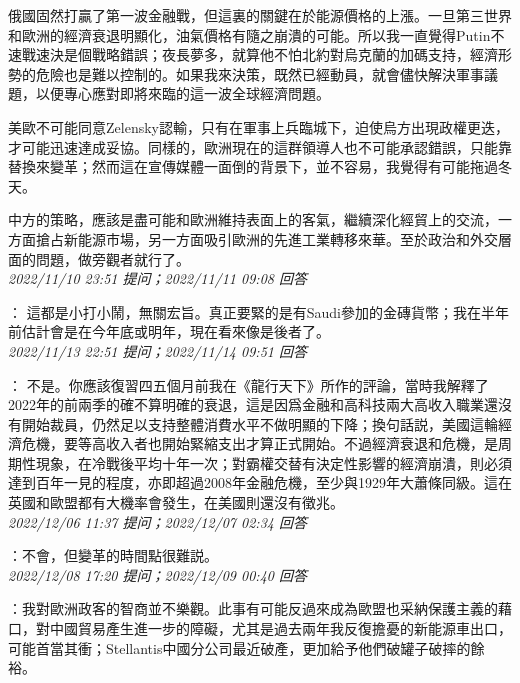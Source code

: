 \documentclass[twocolumn]{ctexart}
\begin{document}
俄國固然打贏了第一波金融戰，但這裏的關鍵在於能源價格的上漲。一旦第三世界和歐洲的經濟衰退明顯化，油氣價格有隨之崩潰的可能。所以我一直覺得Putin不速戰速決是個戰略錯誤；夜長夢多，就算他不怕北約對烏克蘭的加碼支持，經濟形勢的危險也是難以控制的。如果我來決策，既然已經動員，就會儘快解決軍事議題，以便專心應對即將來臨的這一波全球經濟問題。

美歐不可能同意Zelensky認輸，只有在軍事上兵臨城下，迫使烏方出現政權更迭，才可能迅速達成妥協。同樣的，歐洲現在的這群領導人也不可能承認錯誤，只能靠替換來變革；然而這在宣傳媒體一面倒的背景下，並不容易，我覺得有可能拖過冬天。

中方的策略，應該是盡可能和歐洲維持表面上的客氣，繼續深化經貿上的交流，一方面搶占新能源市場，另一方面吸引歐洲的先進工業轉移來華。至於政治和外交層面的問題，做旁觀者就行了。
\\

\textit{\hfill\noindent\small 2022/11/10 23:51 提问；2022/11/11 09:08 回答}

：
這都是小打小鬧，無關宏旨。真正要緊的是有Saudi參加的金磚貨幣；我在半年前估計會是在今年底或明年，現在看來像是後者了。
\\

\textit{\hfill\noindent\small 2022/11/13 22:51 提问；2022/11/14 09:51 回答}

：
不是。你應該復習四五個月前我在《龍行天下》所作的評論，當時我解釋了2022年的前兩季的確不算明確的衰退，這是因爲金融和高科技兩大高收入職業還沒有開始裁員，仍然足以支持整體消費水平不做明顯的下降；換句話説，美國這輪經濟危機，要等高收入者也開始緊縮支出才算正式開始。不過經濟衰退和危機，是周期性現象，在冷戰後平均十年一次；對霸權交替有決定性影響的經濟崩潰，則必須達到百年一見的程度，亦即超過2008年金融危機，至少與1929年大蕭條同級。這在英國和歐盟都有大機率會發生，在美國則還沒有徵兆。
\\

\textit{\hfill\noindent\small 2022/12/06 11:37 提问；2022/12/07 02:34 回答}

：不會，但變革的時間點很難説。
\\

\textit{\hfill\noindent\small 2022/12/08 17:20 提问；2022/12/09 00:40 回答}

：我對歐洲政客的智商並不樂觀。此事有可能反過來成為歐盟也采納保護主義的藉口，對中國貿易產生進一步的障礙，尤其是過去兩年我反復擔憂的新能源車出口，可能首當其衝；Stellantis中國分公司最近破產，更加給予他們破罐子破摔的餘裕。
\\
\end{document}
